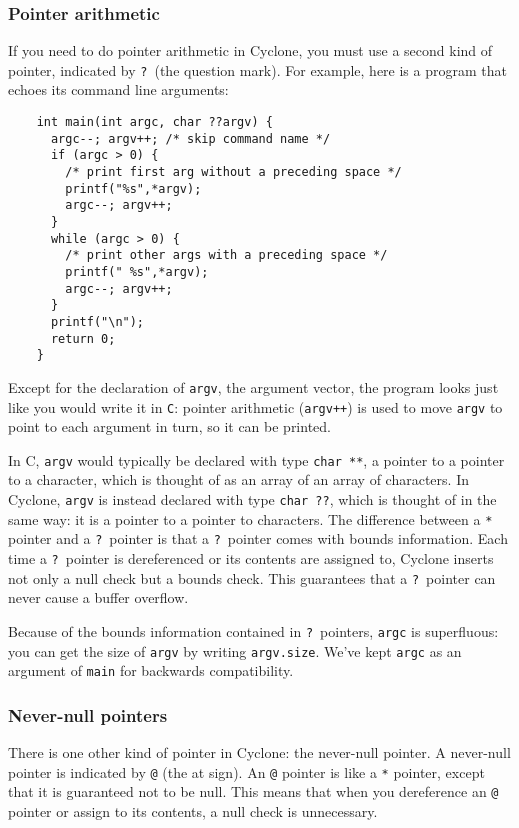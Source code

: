 \subsubsection*{Pointer arithmetic}

If you need to do pointer arithmetic in Cyclone, you must use a second
kind of pointer, indicated by \texttt{?}\ (the question mark).  For
example, here is a program that echoes its command line arguments:
\begin{verbatim}
    int main(int argc, char ??argv) {
      argc--; argv++; /* skip command name */
      if (argc > 0) {
        /* print first arg without a preceding space */
        printf("%s",*argv);
        argc--; argv++;
      }
      while (argc > 0) {
        /* print other args with a preceding space */
        printf(" %s",*argv);
        argc--; argv++;
      }
      printf("\n");
      return 0;
    }
\end{verbatim}

Except for the declaration of \texttt{argv}, the argument vector, the
program looks just like you would write it in \texttt{C}: pointer
arithmetic (\texttt{argv++}) is used to move \texttt{argv} to point
to each argument in turn, so it can be printed.

In C, \texttt{argv} would typically be declared with type \texttt{char
  **}, a pointer to a pointer to a character, which is thought of as
an array of an array of characters.  In Cyclone, \texttt{argv} is
instead declared with type \texttt{char ??}, which is thought of in
the same way: it is a pointer to a pointer to characters.  The
difference between a \texttt{*} pointer and a \texttt{?}\ pointer is
that a \texttt{?}\ pointer comes with bounds information.  Each time a
\texttt{?}\ pointer is dereferenced or its contents are assigned to,
Cyclone inserts not only a null check but a bounds check.  This
guarantees that a \texttt{?}\ pointer can never cause a buffer
overflow.

Because of the bounds information contained in \texttt{?}\ pointers,
\texttt{argc} is superfluous: you can get the size of \texttt{argv} by
writing \texttt{argv.size}.  We've kept \texttt{argc} as an argument
of \texttt{main} for backwards compatibility.

\subsubsection*{Never-null pointers}

There is one other kind of pointer in Cyclone: the never-null pointer.
A never-null pointer is indicated by \texttt{@} (the at sign).  An
\texttt{@} pointer is like a \texttt{*} pointer, except that it is
guaranteed not to be null.  This means that when you dereference an
\texttt{@} pointer or assign to its contents, a null check is
unnecessary.

